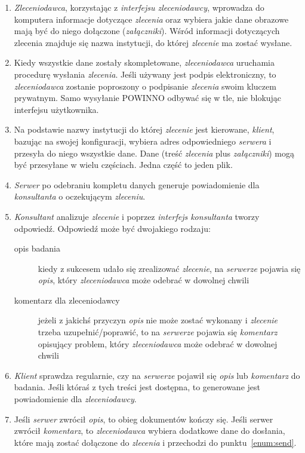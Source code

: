 \documentclass[a4paper]{article}
\begin{document}
\begin{enumerate}
  \item \emph{Zleceniodawca}, korzystając z \emph{interfejsu zleceniodawcy}, wprowadza
  do komputera informacje dotyczące \emph{zlecenia} oraz wybiera jakie dane
  obrazowe mają być do niego dołączone (\emph{załączniki}). Wśród informacji dotyczących
  zlecenia znajduje się nazwa instytucji, do której \emph{zlecenie} ma zostać wysłane.
  \item \label{enum:send} Kiedy wszystkie dane zostały skompletowane,
  \emph{zleceniodawca} uruchamia procedurę wysłania \emph{zlecenia}. Jeśli używany jest
  podpis elektroniczny, to \emph{zleceniodawca} zostanie poproszony o podpisanie
  \emph{zlecenia} swoim kluczem prywatnym. Samo wysyłanie POWINNO odbywać się w tle,
  nie blokując interfejsu użytkownika.
  \item Na podstawie nazwy instytucji do której \emph{zlecenie} jest kierowane,
  \emph{klient}, bazując na swojej konfiguracji, wybiera adres odpowiedniego
  \emph{serwera} i przesyła do niego wszystkie dane. Dane (treść \emph{zlecenia} plus
  \emph{załączniki}) mogą być przesyłane w wielu częściach. Jedna część to jeden plik.
  \item \emph{Serwer} po odebraniu kompletu danych generuje powiadomienie dla
  \emph{konsultanta} o oczekującym \emph{zleceniu}.
  \item \emph{Konsultant} analizuje \emph{zlecenie} i poprzez \emph{interfejs konsultanta}
  tworzy odpowiedź. Odpowiedź może być dwojakiego rodzaju:
  \begin{description}
    \item[opis badania] kiedy z sukcesem udało się zrealizować \emph{zlecenie}, na
    \emph{serwerze} pojawia się \emph{opis}, który \emph{zleceniodawca} może odebrać w
    dowolnej chwili
    \item[komentarz dla zleceniodawcy] jeżeli z jakichś przyczyn \emph{opis} nie może
    zostać wykonany i \emph{zlecenie} trzeba uzupełnić/poprawić, to na \emph{serwerze}
    pojawia się \emph{komentarz} opisujący problem, który \emph{zleceniodawca} może odebrać w
    dowolnej chwili
  \end{description}
  \item \emph{Klient} sprawdza regularnie, czy na \emph{serwerze} pojawił się \emph{opis}
  lub \emph{komentarz} do badania. Jeśli któraś z tych treści jest dostępna, to
  generowane jest powiadomienie dla \emph{zleceniodawcy}. 
  \item Jeśli \emph{serwer} zwrócił \emph{opis}, to obieg dokumentów kończy się.
  Jeśli serwer zwrócił \emph{komentarz}, to \emph{zleceniodawca} wybiera dodatkowe dane do
  dosłania, które mają zostać dołączone do \emph{zlecenia} i przechodzi do \mbox{punktu
  \ref{enum:send}}.
\end{enumerate}
\end{document}
